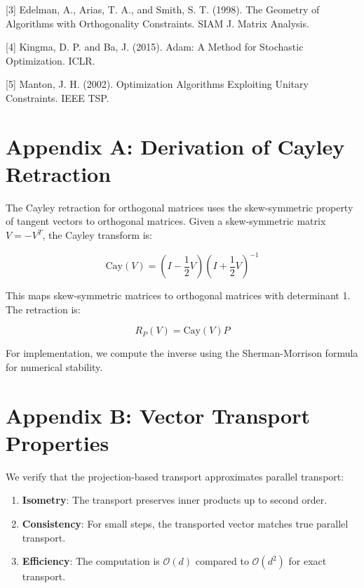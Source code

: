 \documentclass[12pt]{article}
\begin{document}
[3] Edelman, A., Arias, T. A., and Smith, S. T. (1998). The Geometry of Algorithms with Orthogonality Constraints. SIAM J. Matrix Analysis.

[4] Kingma, D. P. and Ba, J. (2015). Adam: A Method for Stochastic Optimization. ICLR.

[5] Manton, J. H. (2002). Optimization Algorithms Exploiting Unitary Constraints. IEEE TSP.

\appendix

\section*{Appendix A: Derivation of Cayley Retraction}

The Cayley retraction for orthogonal matrices uses the skew-symmetric property of tangent vectors to orthogonal matrices. Given a skew-symmetric matrix $V = -V^T$, the Cayley transform is:

\begin{equation}
\text{Cay}(V) = (I - \frac{1}{2}V)(I + \frac{1}{2}V)^{-1}
\end{equation}

This maps skew-symmetric matrices to orthogonal matrices with determinant 1. The retraction is:

\begin{equation}
R_P(V) = \text{Cay}(V)P
\end{equation}

For implementation, we compute the inverse using the Sherman-Morrison formula for numerical stability.

\section*{Appendix B: Vector Transport Properties}

We verify that the projection-based transport approximates parallel transport:

\begin{enumerate}
\item \textbf{Isometry}: The transport preserves inner products up to second order.
\item \textbf{Consistency}: For small steps, the transported vector matches true parallel transport.
\item \textbf{Efficiency}: The computation is $\mathcal{O}(d)$ compared to $\mathcal{O}(d^2)$ for exact transport.
\end{enumerate}
\end{document}
